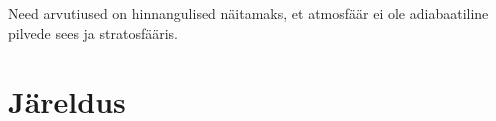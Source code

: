 \documentclass{trkut}%
\begin{document}
Need arvutiused on hinnangulised näitamaks, et atmosfäär ei ole adiabaatiline pilvede sees ja stratosfääris.


\section{Järeldus}









\nocite{*}
\printbibliography


\kinnitusleht%
\end{document}
